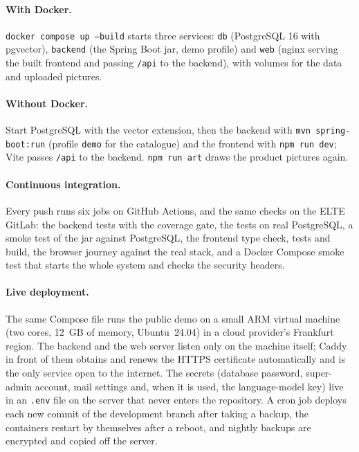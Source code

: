 \paragraph{With Docker.} \texttt{docker compose up --build} starts three services: \texttt{db} (PostgreSQL 16 with
pgvector), \texttt{backend} (the Spring Boot jar, demo profile) and \texttt{web} (nginx serving the built frontend and
passing \texttt{/api} to the backend), with volumes for the data and uploaded pictures.

\paragraph{Without Docker.} Start PostgreSQL with the vector extension, then the backend with
\texttt{mvn spring-boot:run} (profile \texttt{demo} for the catalogue) and the frontend with \texttt{npm run dev}; Vite
passes \texttt{/api} to the backend. \texttt{npm run art} draws the product pictures again.

\paragraph{Continuous integration.} Every push runs six jobs on GitHub Actions, and the same checks on the ELTE GitLab:
the backend tests with the coverage gate, the tests on real PostgreSQL, a smoke test of the jar against PostgreSQL, the
frontend type check, tests and build, the browser journey against the real stack, and a Docker Compose smoke test that
starts the whole system and checks the security headers.

\paragraph{Live deployment.} The same Compose file runs the public demo on a small ARM virtual machine (two cores,
12~GB of memory, Ubuntu~24.04) in a cloud provider's Frankfurt region. The backend and the web server listen only on
the machine itself; Caddy in front of them obtains and renews the HTTPS certificate automatically and is the only
service open to the internet. The secrets (database password, super-admin account, mail settings and, when it is used,
the language-model key) live in an \texttt{.env} file on the server that never enters the repository. A cron job
deploys each new commit of the development branch after taking a backup, the containers restart by themselves after a
reboot, and nightly backups are encrypted and copied off the server.

